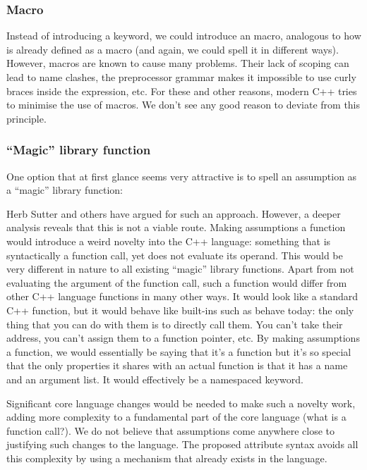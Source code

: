 \subsubsection{Macro}

Instead of introducing a keyword, we could introduce an  macro, analogous to how  is already defined as a macro (and again, we could spell it in different ways). However, macros are known to cause many problems. Their lack of scoping can lead to name clashes, the preprocessor grammar makes it impossible to use curly braces inside the expression, etc. For these and other reasons, modern C++ tries to minimise the use of macros. We don't see any good reason to deviate from this principle.

\subsubsection{``Magic'' library function}

One option that at first glance seems very attractive is to spell an assumption as a ``magic'' library function:

\forceindent
 
Herb Sutter \cite{P2064R0} and others have argued for such an approach. However, a deeper analysis reveals that this is not a viable route. Making assumptions a function would introduce a weird novelty into the C++ language: something that is syntactically a function call, yet does not evaluate its operand. This would be very different in nature to all existing ``magic'' library functions. Apart from not evaluating the argument of the function call, such a function would differ from other C++ language functions in many other ways. It would look like a standard C++ function, but it would behave like built-ins such as  behave today: the only thing that you can do with them is to directly call them. You can't take their address, you can’t assign them to a function pointer, etc. By making assumptions a function, we would essentially be saying that it's a function but it's so special that the only properties it shares with an actual function is that it has a name and an argument list. It would effectively be a namespaced keyword.

Significant core language changes would be needed to make such a novelty work, adding more complexity to a fundamental part of the core language (what is a function call?). We do not believe that assumptions come anywhere close to justifying such changes to the language. The proposed attribute syntax avoids all this complexity by using a mechanism that already exists in the language.

